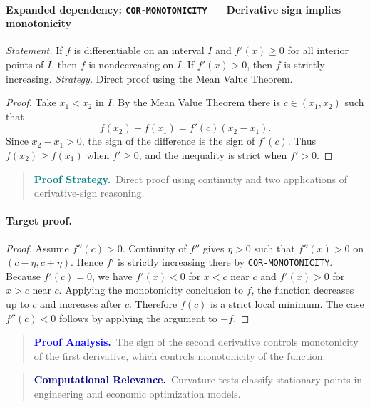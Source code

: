 \documentclass[10pt]{article}
\newcommand{\pidraw}[1]{\begingroup\urlstyle{tt}\nolinkurl{#1}\endgroup}
\newcommand{\pidref}[1]{\hyperref[prf:#1]{\pidraw{#1}}}
\newcommand{\pid}[1]{\pidref{#1}}
\theoremstyle{definition}
\theoremstyle{remark}
\newenvironment{proofstrategy}
{\begin{quote}\small\noindent\textbf{\textcolor{teal}{Proof Strategy.}}\ }
{\end{quote}}
\newenvironment{proofanalysis}
{\begin{quote}\small\noindent\textbf{\textcolor{blue}{Proof Analysis.}}\ }
{\end{quote}}
\newenvironment{computationalrelevance}
{\begin{quote}\small\noindent\textbf{\textcolor{navy}{Computational Relevance.}}\ }
{\end{quote}}
\begin{document}
\paragraph{Expanded dependency: \pidraw{COR-MONOTONICITY} --- Derivative sign implies monotonicity}
\textit{Statement.} If $f$ is differentiable on an interval $I$ and $f'(x)\ge0$ for all interior points of $I$, then $f$ is nondecreasing on $I$. If $f'(x)>0$, then $f$ is strictly increasing.
\textit{Strategy.} Direct proof using the Mean Value Theorem.
\begin{proof}Take $x_1<x_2$ in $I$. By the Mean Value Theorem there is $c\in(x_1,x_2)$ such that
\[
f(x_2)-f(x_1)=f'(c)(x_2-x_1).
\]
Since $x_2-x_1>0$, the sign of the difference is the sign of $f'(c)$.
Thus $f(x_2)\ge f(x_1)$ when $f'\ge0$, and the inequality is strict when
$f'>0$.\end{proof}

\begin{proofstrategy}Direct proof using continuity and two applications of derivative-sign reasoning.\end{proofstrategy}

\paragraph{Target proof.}

\begin{proof}

Assume $f''(c)>0$. Continuity of $f''$ gives $\eta>0$ such that
$f''(x)>0$ on $(c-\eta,c+\eta)$. Hence $f'$ is strictly increasing there by
\pid{COR-MONOTONICITY}. Because $f'(c)=0$, we have
$f'(x)<0$ for $x<c$ near $c$ and $f'(x)>0$ for $x>c$ near $c$.
Applying the monotonicity conclusion to $f$, the function decreases up to $c$
and increases after $c$. Therefore $f(c)$ is a strict local minimum.
The case $f''(c)<0$ follows by applying the argument to $-f$.

\end{proof}

\begin{proofanalysis}The sign of the second derivative controls monotonicity of the first derivative, which controls monotonicity of the function.\end{proofanalysis}

\begin{computationalrelevance}Curvature tests classify stationary points in engineering and economic optimization models.\end{computationalrelevance}
\end{document}
